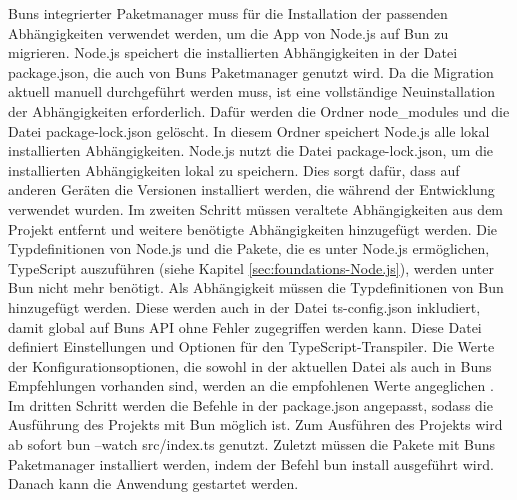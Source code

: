 \noindent
Buns integrierter Paketmanager muss für die Installation der passenden Abhängigkeiten verwendet werden, um die App von Node.js auf Bun zu migrieren. Node.js speichert die installierten Abhängigkeiten in der Datei \glq package.json\grq{}, die auch von Buns Paketmanager genutzt wird. Da die Migration aktuell manuell durchgeführt werden muss, ist eine vollständige Neuinstallation der Abhängigkeiten erforderlich. Dafür werden die Ordner \glq node\_modules\grq{} und die Datei \glq package-lock.json\grq{} gelöscht. In diesem Ordner speichert Node.js alle lokal installierten Abhängigkeiten. Node.js nutzt die Datei \glq package-lock.json\grq{}, um die installierten Abhängigkeiten lokal zu speichern. Dies sorgt dafür, dass auf anderen Geräten die Versionen installiert werden, die während der Entwicklung verwendet wurden. \newline
Im zweiten Schritt müssen veraltete Abhängigkeiten aus dem Projekt entfernt und weitere benötigte Abhängigkeiten hinzugefügt werden. Die Typdefinitionen von Node.js und die Pakete, die es unter Node.js ermöglichen, TypeScript auszuführen (siehe Kapitel \ref{sec:foundations-Node.js}), werden unter Bun nicht mehr benötigt. Als Abhängigkeit müssen die Typdefinitionen von Bun hinzugefügt werden. Diese werden auch in der Datei \glq ts-config.json\grq{} inkludiert, damit global auf Buns API ohne Fehler zugegriffen werden kann. Diese Datei definiert Einstellungen und Optionen für den TypeScript-Transpiler. Die Werte der Konfigurationsoptionen, die sowohl in der aktuellen Datei als auch in Buns Empfehlungen vorhanden sind, werden an die empfohlenen Werte angeglichen \cite{OvenSh.2023e}.\newline 
Im dritten Schritt werden die Befehle in der \glq package.json\grq{} angepasst, sodass die Ausführung des Projekts mit Bun möglich ist. Zum Ausführen des Projekts wird ab sofort \glq bun --watch src/index.ts\grq{} genutzt. Zuletzt müssen die Pakete mit Buns Paketmanager installiert werden, indem der Befehl \glq bun install\grq{} ausgeführt wird. Danach kann die Anwendung gestartet werden.\\

